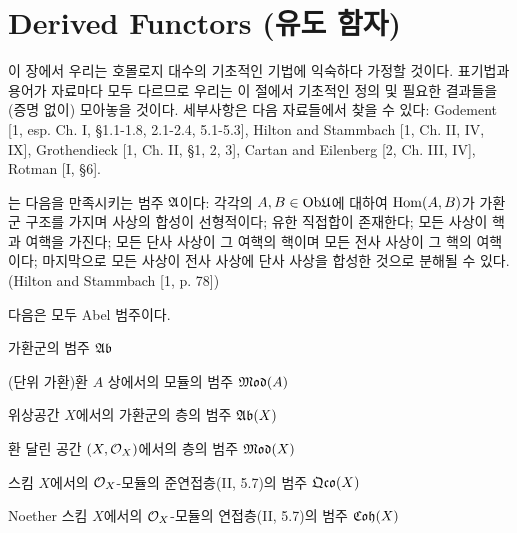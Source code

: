 	\section{Derived Functors (유도 함자)}
	
	이 장에서 우리는 호몰로지 대수의 기초적인 기법에 익숙하다 가정할 것이다.
	표기법과 용어가 자료마다 모두 다르므로 우리는 이 절에서 기초적인 정의 및 필요한 결과들을 (증명 없이) 모아놓을 것이다.
	세부사항은 다음 자료들에서 찾을 수 있다: Godement [1, esp. Ch. I, \S 1.1-1.8, 2.1-2.4, 5.1-5.3],
	Hilton and Stammbach [1, Ch. II, IV, IX], Grothendieck [1, Ch. II, \S 1, 2, 3],
	Cartan and Eilenberg [2, Ch. III, IV], Rotman [I, \S 6].
	
	
	\begin{definition}
	는 다음을 만족시키는 범주 $\mathfrak{A}$이다:
	각각의 $A,B\in\mathrm{Ob}\mathfrak{U}$에 대하여 $\operatorname{Hom}(A,B)$가 가환군 구조를 가지며 사상의 합성이 선형적이다;
	유한 직접합이 존재한다; 모든 사상이 핵과 여핵을 가진다; 모든 단사 사상이 그 여핵의 핵이며 모든 전사 사상이 그 핵의 여핵이다;
	마지막으로 모든 사상이 전사 사상에 단사 사상을 합성한 것으로 분해될 수 있다. (Hilton and Stammbach [1, p. 78])
	\end{definition}
	
	다음은 모두 Abel 범주이다.
	
	
	\begin{example}
	가환군의 범주 $\mathfrak{Ab}$
	\end{example}
	
	
	\begin{example}
	(단위 가환)환 $A$ 상에서의 모듈의 범주 $\mathfrak{Mod}(A)$
	\end{example}
	
	
	\begin{example}
	위상공간 $X$에서의 가환군의 층의 범주 $\mathfrak{Ab}(X)$
	\end{example}
	
	
	\begin{example}
	환 달린 공간 $(X,\mathcal{O}_X)$에서의 층의 범주 $\mathfrak{Mod}(X)$
	\end{example}
	
	
	\begin{example}
	스킴 $X$에서의 $\mathcal{O}_X$-모듈의 준연접층(II, 5.7)의 범주 $\mathfrak{Qco}(X)$
	\end{example}
	
	
	\begin{example}
	Noether 스킴 $X$에서의 $\mathcal{O}_X$-모듈의 연접층(II, 5.7)의 범주 $\mathfrak{Coh}(X)$
	\end{example}
	

